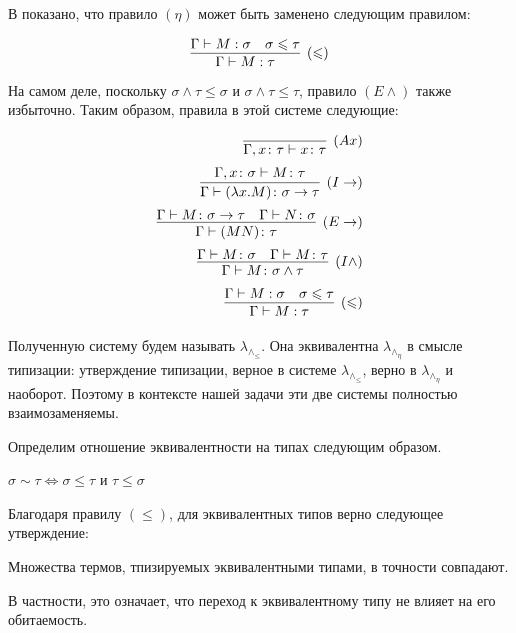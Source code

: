 \documentclass{spbau-diploma}
\begin{document}
В \cite{hindley_92} показано, что правило $(\eta)$ может быть заменено следующим правилом:

$$\infer[(\leqslant)]{\Gamma \vdash M : \tau}{\Gamma \vdash M : \sigma & \sigma \leqslant \tau}$$

На самом деле, поскольку $\sigma \wedge \tau \leqslant \sigma$ и $\sigma \wedge \tau \leqslant \tau$, правило $(E \wedge)$ также избыточно. Таким образом, правила в этой системе следующие: 

\begin{equation} \label{rules subtype}
\begin{aligned}
\infer[(Ax)]{\Gamma, x \colon \tau \vdash x \colon \tau}{}\\[2pt]
\infer[(I\to)]{\Gamma \vdash (\lambda x . M) \colon \sigma \to \tau}{\Gamma, x \colon \sigma \vdash M \colon \tau}\\[2pt]
\infer[(E\to)]{\Gamma \vdash (MN) \colon \tau}{\Gamma \vdash M \colon \sigma \to \tau & \Gamma \vdash N \colon \sigma}\\[2pt]
\infer[(I\wedge)]{\Gamma \vdash M \colon \sigma \wedge \tau}{\Gamma \vdash M \colon \sigma & \Gamma \vdash M \colon \tau}\\[2pt]
\infer[(\leqslant)]{\Gamma \vdash M : \tau}{\Gamma \vdash M : \sigma & \sigma \leqslant \tau}

\end{aligned}
\end{equation}

Полученную систему будем называть $\lambda_\wedge_\leqslant$. Она эквивалентна $\lambda_\wedge_\eta$ в смысле типизации: утверждение типизации, верное в системе  $\lambda_\wedge_\leqslant$, верно в $\lambda_\wedge_\eta$ и наоборот. Поэтому в контексте нашей задачи эти две системы полностью взаимозаменяемы.

Определим отношение эквивалентности на типах следующим образом. 

\begin{definition}
$\sigma \sim \tau \iff \sigma \leqslant \tau$ и $\tau \leqslant \sigma$
\end{definition}

Благодаря правилу $(\leqslant)$, для эквивалентных типов верно следующее утверждение:

\begin{lemma}
Множества термов, тпизируемых эквивалентными типами, в точности совпадают.
\end{lemma}

В частности, это означает, что переход к эквивалентному типу не влияет на его обитаемость.
\end{document}
